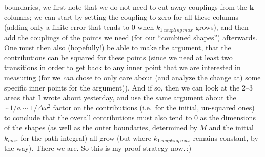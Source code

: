 \documentclass{report}
\begin{document}
boundaries, we first note that we do not need to cut away couplings from the $\boldsymbol{k}$-columns; we can start by setting the coupling to zero for all these columns (adding only a finite error that tends to 0 when $k_{1\,coupling\,max}$ grows), and then add the couplings of the points we need (for our ``combined shapes'') afterwards. One must then also (hopefully!) be able to make the argument, that the contributions can be squared for these points (since we need at least two transitions in order to get back to any inner point that we are interested in measuring (for we \emph{can} chose to only care about (and analyze the change at) some specific inner points for the argument)). And if so, then we can look at the 2--3 areas that I wrote about yesterday, and use the same argument about the $\sim 1/a \sim 1/\Delta\omega^2$ factor on the contributions (i.e.\ for the initial, un-squared ones) to conclude that the overall contributions must also tend to 0 as the dimensions of the shapes (as well as the outer boundaries, determined by $M$ and the initial $k_{max}$ for the path integral) all grow (but where $k_{1\,coupling\,max}$ remains constant, by the way). There we are. So this is my proof strategy now.\,:) 
\end{document}
